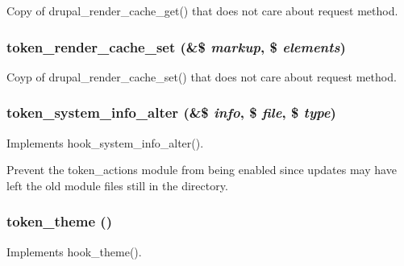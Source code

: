 \label{token_8module_ade265e3948eec87805cabf40bf0c233d}
Copy of drupal\_\-render\_\-cache\_\-get() that does not care about request method. \hypertarget{token_8module_ab8f5c3ba81f8ff179b4e5be70a3ab54d}{
\subsubsection[{token\_\-render\_\-cache\_\-set}]{\setlength{\rightskip}{0pt plus 5cm}token\_\-render\_\-cache\_\-set (\&\$ {\em markup}, \/  \$ {\em elements})}}
\label{token_8module_ab8f5c3ba81f8ff179b4e5be70a3ab54d}
Coyp of drupal\_\-render\_\-cache\_\-set() that does not care about request method. \hypertarget{token_8module_a9ae1dc9d82981ee97ee1921bebbf59fc}{
\subsubsection[{token\_\-system\_\-info\_\-alter}]{\setlength{\rightskip}{0pt plus 5cm}token\_\-system\_\-info\_\-alter (\&\$ {\em info}, \/  \$ {\em file}, \/  \$ {\em type})}}
\label{token_8module_a9ae1dc9d82981ee97ee1921bebbf59fc}
Implements hook\_\-system\_\-info\_\-alter().

Prevent the token\_\-actions module from being enabled since updates may have left the old module files still in the directory. \hypertarget{token_8module_a6689af0bf91fa39c1859c95b59aafd5a}{
\subsubsection[{token\_\-theme}]{\setlength{\rightskip}{0pt plus 5cm}token\_\-theme ()}}
\label{token_8module_a6689af0bf91fa39c1859c95b59aafd5a}
Implements hook\_\-theme(). 